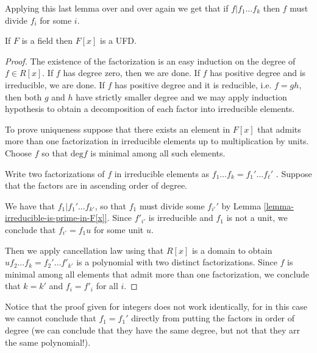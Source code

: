 Applying this last lemma over and over again
we get that if $f|f_1\ldots f_k$
then $f$ must divide $f_i$ for some $i$.

\begin{lemma}
\label{lemma-polynomials-over-fields-are-UFD}
If $F$ is a field then $F[x]$ is a UFD.
\end{lemma}

\begin{proof}
The existence of the factorization is an easy
induction on the degree of $f\in
R[x]$. If $f$ has degree zero, then we are
done. If $f$ has positive degree and
is irreducible, we are done. If $f$ has
positive degree and it is reducible,
i.e. $f=gh$, then both $g$ and $h$ have
strictly smaller degree and we may apply
induction hypothesis to obtain a
decomposition of each factor into irreducible
elements.

To prove uniqueness suppose that there exists
an element in $F[x]$ that admits
more than one factorization in irreducible
elements
up to multiplication by units. Choose $f$ so
that
$\text{deg}f$ is minimal among all such
elements.

Write two factorizations of $f$ in
irreducible elements as
$f_1\ldots f_k=f_1'\ldots f_\ell'$ . Suppose
that the factors are in
ascending order of degree.

We have that $f_1|f_1'\ldots f_{k'}$, so
that $f_1$ must divide some $f_{i'}'$
by Lemma
\ref{lemma-irreducible-is-prime-in-F[x]}.
Since $f'_{i'}$ is irreducible and $f_1$ is
not a unit, we conclude that $f_{i'}=f_1 u$
for some unit $u$.

Then we apply cancellation law using that
$R[x]$ is a domain
to obtain $uf_2\ldots f_k=f_2'\ldots f'_{k'}$
is a
polynomial with two distinct factorizations.
Since $f$ is minimal among all
elements that admit more than one
factorization, we conclude that $k=k'$ and
$f_i=f'_i$ for all $i$.
\end{proof}

\begin{remark}
\label{remark-not-the-same-as-in-Z}
Notice that the proof given for integers does
not work identically,
for in this case we cannot conclude that
$f_1=f_1'$ directly from putting the
factors in order of degree (we can conclude
that they have the same degree, but
not that they arr the same polynomial!).
\end{remark}

